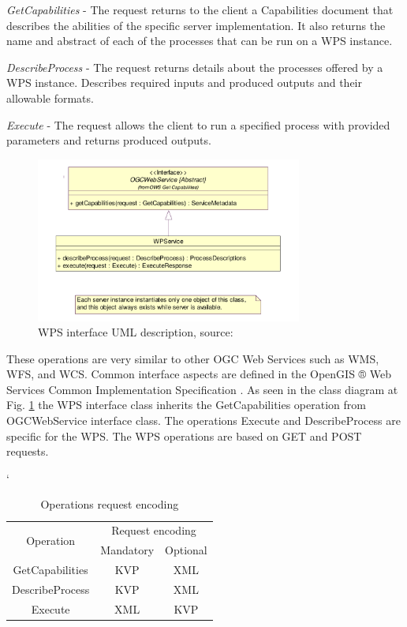 \documentclass[12pt,a4paper]{article}
\begin{document}
\textit{GetCapabilities} - The request returns to the client a Capabilities document that describes the abilities
of the specific server implementation. It also returns the name and abstract of each of the processes that can
be run on a WPS instance.

\textit{DescribeProcess} - The request returns details about the processes offered by a WPS instance. Describes
required inputs and produced outputs and their allowable formats.

\textit{Execute} - The request allows the client to run a specified process with provided parameters and returns
produced outputs.

\begin{figure}[h!]
\centering
\includegraphics[width=0.78\textwidth]{img/WPS_class_diagram.png}
\caption{WPS interface UML description, source: \cite{WPS_standart_1.0}}
\label{fig:WPS_class_diagram}
\end{figure}

These operations are very similar to other OGC Web Services such as WMS, WFS, and WCS. Common interface aspects
are defined in the OpenGIS ® Web Services Common Implementation Specification \cite{OGC_common}. As seen in 
the class diagram at Fig. \ref{fig:WPS_class_diagram} the WPS interface class inherits the GetCapabilities operation 
from OGCWebService interface class. The operations Execute and DescribeProcess are specific for the WPS. The WPS
operations are based on GET and POST requests.

\bigskip
\begin{table}[h!]
\catcode`
\centering
\begin{tabular}{|c|c|c|}
\hline
\multirow{2}{*}{Operation} & \multicolumn{2}{c|}{Request encoding} \\ \cline{2-3} 
                           & Mandatory          & Optional         \\ \hhline{|=|=|=|}
GetCapabilities            & KVP                & XML              \\ \hline
DescribeProcess            & KVP                & XML              \\ \hline
Execute                    & XML                & KVP              \\ \hline
\end{tabular}
\caption{Operations request encoding}
\label{tab:WPS_encoding}
\end{table}
\end{document}

